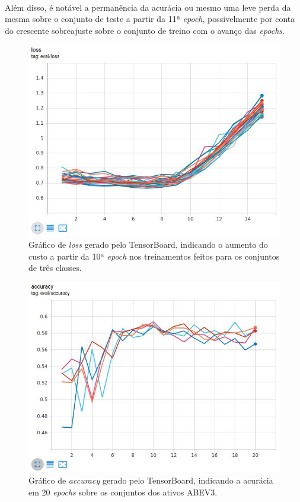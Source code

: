 \documentclass[grad,numbers]{coppe}
\begin{document}
		  	\paragraph{}Além disso, é notável a permanência da acurácia ou mesmo uma leve perda da mesma sobre o conjunto de teste a partir da 11ª \textit{epoch}, possivelmente por conta do crescente sobreajuste sobre o conjunto de treino com o avanço das \textit{epochs}.
		  	\begin{figure}[H]
		  		\centering
		  		{\includegraphics[width=13.5cm]{loss_graph}
		  			\caption{Gráfico de \textit{loss} gerado pelo TensorBoard, indicando o aumento do custo a partir da 10ª \textit{epoch} nos treinamentos feitos para os conjuntos de três classes.}
		  			\label{fig:loss_graph-fig}}
		  	\end{figure}
			 	\begin{figure}[H]
			 		\centering
			 		{\includegraphics[width=13.5cm]{20e-graph}
			 			\caption{Gráfico de \textit{accuracy} gerado pelo TensorBoard, indicando a acurácia em 20 \textit{epochs} sobre os conjuntos dos ativos ABEV3.}
			 			\label{fig:20e-graph-fig}}
			 	\end{figure}
\end{document}
